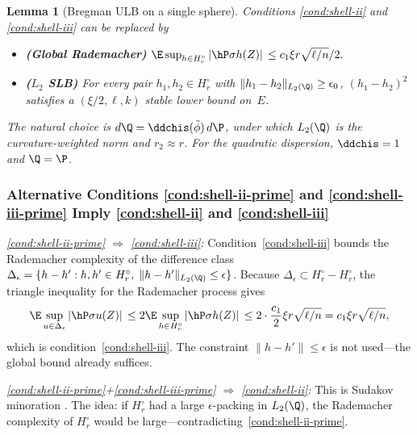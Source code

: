 \documentclass{article}
\makeatletter
\newcommand{\customlabel}[2]{%
  \phantomsection\begingroup\def\@currentlabel{#2}\label{#1}\endgroup}
\newtheorem{lemma}[theorem]{Lemma}
\makeatother
\begin{document}
\begin{lemma}[Bregman ULB on a single sphere]
\medskip

Conditions \ref{cond:shell-ii} and \ref{cond:shell-iii}
can be replaced by
\begin{itemize}
\item[\textup{(ii$'$)}]\customlabel{cond:shell-ii-prime}{\textup{ii$'$}}
  \textbf{(Global Rademacher)}
  $\E\sup_{h \in H_r^\circ} \abs*{\hP \sigma h(Z)}
    \le c_1 \xi r \sqrt{\ell/n} / 2.$
\item[\textup{(iii$'$)}]\customlabel{cond:shell-iii-prime}{\textup{iii$'$}}
  \textbf{($L_2$ SLB)}
  For every pair $h_1, h_2 \in H_r^\circ$
  with $\|h_1 - h_2\|_{L_2(\Q)} \ge \epsilon_0$,
  $(h_1 - h_2)^2$ satisfies
  a $(\xi/2, \ell, k)$ stable lower bound on~$E$.
\end{itemize}
The natural choice is $d\Q = \ddchis(\tilde\phi)\,d\P$,
under which $L_2(\Q)$ is the curvature-weighted norm
and $r_2 \approx r$.
For the quadratic dispersion, $\ddchis = 1$ and $\Q = \P$.
\end{lemma}

\subsubsection{Alternative Conditions \ref{cond:shell-ii-prime} and \ref{cond:shell-iii-prime} Imply \ref{cond:shell-ii} and \ref{cond:shell-iii}}

\textit{\ref{cond:shell-ii-prime} $\Rightarrow$ \ref{cond:shell-iii}:} Condition~\ref{cond:shell-iii} bounds the Rademacher complexity of the difference class $\Delta_\epsilon = \{h - h' : h, h' \in H_r^\circ,\; \|h-h'\|_{L_2(\Q)} \le \epsilon\}$. Because $\Delta_\epsilon \subset H_r^\circ - H_r^\circ$, the triangle inequality for the Rademacher process gives
\[
\E\sup_{u \in \Delta_\epsilon} \abs*{\hP \sigma u(Z)} \le 2\E\sup_{h \in H_r^\circ} \abs*{\hP \sigma h(Z)} \le 2 \cdot \frac{c_1}{2} \xi r \sqrt{\ell/n} = c_1 \xi r \sqrt{\ell/n},
\]
which is condition~\ref{cond:shell-iii}. The constraint $\|h-h'\| \le \epsilon$ is not used---the global bound already suffices.

\textit{\ref{cond:shell-ii-prime}+\ref{cond:shell-iii-prime} $\Rightarrow$ \ref{cond:shell-ii}:} This is Sudakov minoration \citep[Theorem 4.4]{mendelson2021extending}. The idea: if $H_r^\circ$ had a large $\epsilon$-packing in $L_2(\Q)$, the Rademacher complexity of $H_r^\circ$ would be large---contradicting~\ref{cond:shell-ii-prime}.
\end{document}
